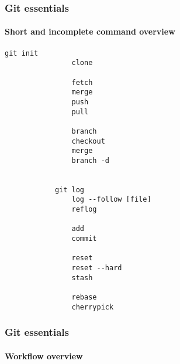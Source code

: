 \documentclass[aspectratio=169]{beamer}
\newcommand{\adjustimg}{%
  \checkoddpage%
  \ifoddpage\hspace*{\dimexpr\evensidemargin-\oddsidemargin}\else\hspace*{-\dimexpr\evensidemargin-\oddsidemargin}\fi%
}
\newcommand{\centerimg}[2][width=\textwidth]{%
  \makebox[\textwidth]{\adjustimg\texttt{[image: \#2]}}%
}
\begin{document}
    \begin{comment}
    \begin{frame}
        \begin{tikzpicture}
            \gitDAG[grow right sep = 2em]{
                A -- B -- {
                  C,
                  D -- E,
                }
            };
            \gittag
                [v0p1]      %
                {v0.1}      %
                {above=of A}%
                {A}         %
            \gitremotebranch
                [originmaster]
                {origin/master}
                {above=of C}
                {C}
            \gitbranch
                {master}
                {above=of E}
                {E}
            \gitHEAD
                {above=of master}
                {master}
        \end{tikzpicture}
    \end{frame}
    \end{comment}
    \begin{frame}[fragile]
        \frametitle{Git essentials}
        \framesubtitle{Short and incomplete command overview}
        \begin{multicols}{2}
        \begin{lstlisting}[gobble=12]
            git init                
                clone

                fetch
                merge
                push
                pull

                branch
                checkout
                merge
                branch -d


            git log                
                log --follow [file]
                reflog

                add
                commit

                reset
                reset --hard
                stash

                rebase
                cherrypick
        \end{lstlisting}
        \end{multicols}
    \end{frame}
    \begin{frame}
        \frametitle{Git essentials}
        \framesubtitle{Workflow overview}
        \noindent\centerimg[width=0.8\textwidth]{workflow.png}
    \end{frame}
\end{document}
